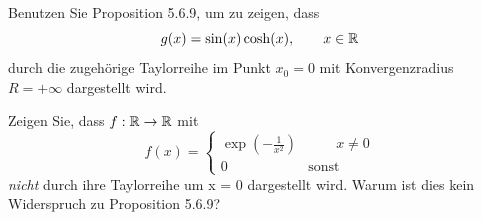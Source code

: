 \begin{Problem}
\begin{parts}
	\item Benutzen Sie Proposition 5.6.9, um zu zeigen, dass
		\[
		g(x)=\sin(x)\cosh(x), \qquad x\in \mathbb{R}
		\] 
durch die zugehörige Taylorreihe im Punkt $x_0 = 0$ mit Konvergenzradius $R=+\infty$ dargestellt wird.
\item Zeigen Sie, dass $f:\mathbb{R}\to \mathbb{R}$ mit
	\[
	f(x)=\begin{cases}
		\exp\left( -\frac{1}{x^2} \right) & \qquad x \neq 0\\
		0 & \text{sonst}
	\end{cases}
	\]
	\emph{nicht} durch ihre Taylorreihe um x = 0 dargestellt wird. Warum ist dies kein Widerspruch zu Proposition 5.6.9?
\end{parts}	
\end{Problem}
